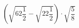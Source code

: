 \begin{ex}[type=calculate]
	\begin{condition}
		\( \left( \sqrt{62\dfrac{1}{2}}-\sqrt{22\dfrac{1}{2}} \right)\cdot\sqrt{\dfrac{5}{8}} \)
	\end{condition}
\end{ex}